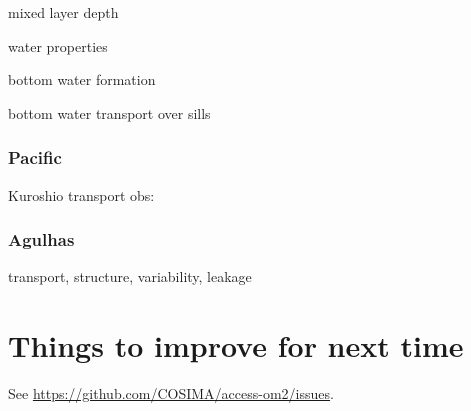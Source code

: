 \documentclass[11pt, a4paper]{article}
\begin{document}
mixed layer depth

water properties

bottom water formation

bottom water transport over sills

\citet{WangIlicakGerdesDrangeAksenovBaileyBentsenBiastochBozec2016b}
\citet{IlicakDrangeWangGerdesAksenovBaileyBentsenBiastochBozec2016a}

\subsubsection{Pacific}
\citet{TsengLinChenThompsonBentsenBoningBozecCassouChassignet2016a}

Kuroshio transport obs: \citet{JohnsLeeZhangZantoppLiuYang2001a}

\subsubsection{Agulhas}
transport, structure, variability, leakage
 
 \newpage
 
\section{Things to improve for next time}
See \url{https://github.com/COSIMA/access-om2/issues}.
\end{document}
